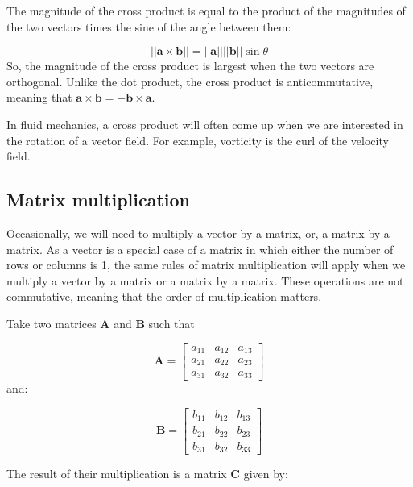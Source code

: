 \documentclass[12pt]{article}
\numberwithin{equation}{section}
\numberwithin{figure}{section}
\numberwithin{table}{section}
\begin{document}
The magnitude of the cross product is equal to the product of the magnitudes of
the two vectors times the sine of the angle between them:

\begin{equation}
  ||\mathbf{a} \times \mathbf{b}|| = ||\mathbf{a}|| ||\mathbf{b}|| \sin{\theta}
  \label{eq:cross_product_magnitude}
\end{equation}
So, the magnitude of the cross product is largest when the two vectors are
orthogonal.
Unlike the dot product, the cross product is anticommutative, meaning that
$\mathbf{a} \times \mathbf{b} = -\mathbf{b} \times \mathbf{a}$.

In fluid mechanics, a cross product will often come up when we are interested in
the rotation of a vector field.
For example, vorticity is the curl of the velocity field.

\subsection{Matrix multiplication}

Occasionally, we will need to multiply a vector by a matrix, or, a matrix by a
matrix.
As a vector is a special case of a matrix in which either the number of rows or
columns is 1, the same rules of matrix multiplication will apply when we
multiply a vector by a matrix or a matrix by a matrix.
These operations are not commutative, meaning that the order of multiplication
matters.

Take two matrices $\mathbf{A}$ and $\mathbf{B}$ such that

\begin{equation}
  \mathbf{A} =
  \begin{bmatrix}
    a_{11} & a_{12} & a_{13} \\
    a_{21} & a_{22} & a_{23} \\
    a_{31} & a_{32} & a_{33}
  \end{bmatrix}
\end{equation}
and:

\begin{equation}
  \mathbf{B} =
  \begin{bmatrix}
    b_{11} & b_{12} & b_{13} \\
    b_{21} & b_{22} & b_{23} \\
    b_{31} & b_{32} & b_{33}
  \end{bmatrix}
\end{equation}

The result of their multiplication is a matrix $\mathbf{C}$ given by:
\end{document}
